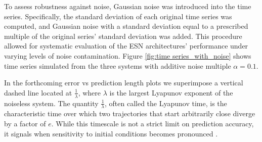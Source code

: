 To assess robustness against noise, Gaussian noise was introduced into the time series. Specifically, the standard deviation of each original time series was computed, and Gaussian noise with a standard deviation equal to a prescribed multiple of the original series' standard deviation was added. This procedure allowed for systematic evaluation of the ESN architectures' performance under varying levels of noise contamination. Figure \ref{fig:time series_with_noise} shows time series simulated from the three systems with additive noise multiple $\alpha=0.1$.

In the forthcoming error vs prediction length plots we superimpose a vertical dashed line located at $\frac{1}{\lambda}$, where $\lambda$ is the largest Lyapunov exponent of the noiseless system. The quantity $\frac{1}{\lambda}$, often called the Lyapunov time, is the characteristic time over which two trajectories that start arbitrarily close diverge by a factor of $e$. While this timescale is not a strict limit on prediction accuracy, it signals when sensitivity to initial conditions becomes pronounced \cite{kantz_2003}.

